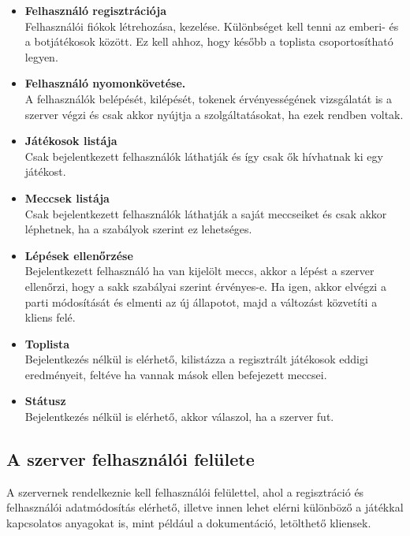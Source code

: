 \documentclass[twoside, a4paper, 12pt]{book}
\begin{document}
\begin{itemize}
	
	\item \textbf{Felhasználó regisztrációja} \\
	Felhasználói fiókok létrehozása, kezelése. Különbséget kell tenni az emberi- és a botjátékosok között. Ez kell ahhoz, hogy később a toplista csoportosítható legyen.
	
	\item \textbf{Felhasználó nyomonkövetése.} \\
	A felhasználók belépését, kilépését, tokenek érvényességének vizsgálatát is a szerver végzi és csak akkor nyújtja a szolgáltatásokat, ha ezek rendben voltak.
	
	\item \textbf{Játékosok listája} \\
	Csak bejelentkezett felhasználók láthatják és így csak ők hívhatnak ki egy játékost.
	
	\item \textbf{Meccsek listája} \\
	Csak bejelentkezett felhasználók láthatják a saját meccseiket és csak akkor léphetnek, ha a szabályok szerint ez lehetséges.
	
	\item \textbf{Lépések ellenőrzése} \\
	Bejelentkezett felhasználó ha van kijelölt meccs, akkor a lépést a szerver ellenőrzi, hogy a sakk szabályai szerint érvényes-e. Ha igen, akkor elvégzi a parti módosítását és elmenti az új állapotot, majd a változást közvetíti a kliens felé.
	
	\item \textbf{Toplista} \\
	Bejelentkezés nélkül is elérhető, kilistázza a regisztrált játékosok eddigi eredményeit, feltéve ha vannak mások ellen befejezett meccsei.
	
	\item \textbf{Státusz} \\
	Bejelentkezés nélkül is elérhető, akkor válaszol, ha a szerver fut.
		
\end{itemize}

\subsection{A szerver felhasználói felülete}
A szervernek rendelkeznie kell felhasználói felülettel, ahol a regisztráció és felhasználói adatmódosítás elérhető, illetve innen lehet elérni különböző a játékkal kapcsolatos anyagokat is, mint például a dokumentáció, letölthető kliensek.
\end{document}
